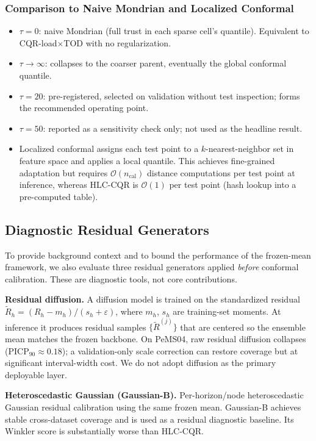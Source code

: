 \documentclass[letterpaper,journal]{IEEEtran}
\begin{document}
\subsubsection{Comparison to Naive Mondrian and Localized Conformal}
\begin{itemize}
    \item $\tau=0$: naive Mondrian (full trust in each sparse cell's
    quantile).  Equivalent to CQR-load$\times$TOD with no regularization.
    \item $\tau\to\infty$: collapses to the coarser parent, eventually the
    global conformal quantile.
    \item $\tau=20$: pre-registered, selected on validation without test
    inspection; forms the recommended operating point.
    \item $\tau=50$: reported as a sensitivity check only; not used as the
    headline result.
    \item Localized conformal assigns each test point to a
    $k$-nearest-neighbor set in feature space and applies a local
    quantile.  This achieves fine-grained adaptation but requires
    $\mathcal{O}(n_\text{cal})$ distance computations per test point at
    inference, whereas HLC-CQR is $\mathcal{O}(1)$ per test point (hash
    lookup into a pre-computed table).
\end{itemize}

\subsection{Diagnostic Residual Generators}
\label{sec:diagnostic_residual}

To provide background context and to bound the performance of the frozen-mean
framework, we also evaluate three residual generators applied \emph{before}
conformal calibration.  These are diagnostic tools, not core contributions.

\textbf{Residual diffusion.}  A diffusion model is trained on the
standardized residual $\tilde{R}_h=(R_h-m_h)/(s_h+\varepsilon)$, where
$m_h$, $s_h$ are training-set moments.  At inference it produces residual
samples $\{\tilde{R}^{(j)}\}$ that are centered so the ensemble mean
matches the frozen backbone.  On PeMS04, raw residual diffusion collapses
(PICP$_{90}\approx 0.18$); a validation-only scale correction can restore
coverage but at significant interval-width cost.  We do not adopt diffusion
as the primary deployable layer.

\textbf{Heteroscedastic Gaussian (Gaussian-B).}  Per-horizon/node
heteroscedastic Gaussian residual calibration using the same frozen mean.
Gaussian-B achieves stable cross-dataset coverage and is used as a residual
diagnostic baseline.  Its Winkler score is substantially worse than HLC-CQR.
\end{document}
